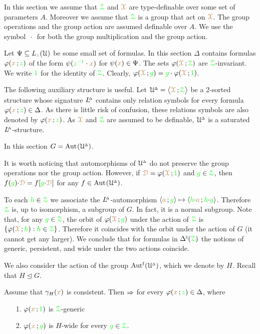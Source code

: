 In this section we assume that $\grZ$ and $\mrX$ are type-definable over some set of parameters $A$.
Moreover we assume that $\grZ$ is a group that act on $\mrX$.
The group operations and the group action are assumed definable over $A$.
We use the symbol $\,\cdot\,$ for both the group multiplication and the group action.

Let $\Psi\subseteq L_{\mr x}(\U)$ be some small set of formulas.
In this section $\Delta$ contains formulas $\phi({\mr x}\,;{\gr z})$ of the form  $\psi({\gr z^{-1}}\cdot{\mr x})$ for $\psi({\mr x})\in\Psi$.
The sets $\phi(\mrX\,;\grZ)$ are $\grZ$-invariant.
We write ${\gr 1}$ for the identity of $\grZ$.
Clearly, $\phi(\mrX\,;{\gr g})={\gr g}\cdot\phi(\mrX\,;{\gr 1})$.

The following auxiliary structure is useful.
Let $\UDelta=\big\<\mrX\,;\grZ\big\>$ be a 2-sorted structure whose signature $\LDelta$ contains only relation symbols for every formula $\phi({\mr x}\,;{\gr z})\in\Delta$.
As there is little risk of confusion, these relations symbols are also denoted by $\phi({\mr x}\,;{\gr z})$.
As $\mrX$ and $\grZ$ are assumed to be definable, $\UDelta$ is a saturated $\LDelta$-structure.

In this section $G=\Aut(\UDelta)$. 

It is worth noticing that automorphisms of $\UDelta$ do not preserve the group operations nor the group action.
However, if $\mrD=\phi(\mrX\,;{\gr 1})$ and ${\gr g}\in\grZ$, then $f({\gr g}){\cdot}\mrD=f[{\gr g}{\cdot}\mrD]$ for any $f\in\Aut(\UDelta)$.

To each ${\gr h}\in\grZ$ we associate the $\LDelta$-automorphism $\<{\mr a}\,;{\gr g}\>\mapsto\<{\gr h}{\cdot}{\mr a}\,;{\gr h}{\cdot}{\gr g}\>$.
Therefore $\grZ$ is, up to isomorphism, a subgroup of $G$.
In fact, it is a normal subgroup.
Note that, for any ${\gr g}\in\grZ$, the orbit of $\phi(\mrX\,;{\gr g})$ under the action of $\grZ$ is $\{\phi(\mrX\,;{\gr h}) : {\gr h}\in\grZ\}$.
Therefore it coincides with the orbit under the action of $G$ (it cannot get any larger).
We conclude that for formulas in $\pmDelta(\grZ)$ the notions of generic, persistent, and wide under the two actions coincide.

We also consider the action of the group $\Autf(\UDelta)$, which we denote by \emph{$H$.}
Recall that $H\trianglelefteq G$.

\begin{proposition}\label{prop_Ggeneric_persistent}
  Assume that $\gamma_H({\mr x})$ is consistent.
  Then $\IMP$ for every $\phi({\mr x}\,;{\gr z})\in\Delta$, where
  \begin{itemize}
    \item [1.] $\phi({\mr x}\,;{\gr 1})$ is $\grZ$-generic
    \item [2.] $\phi({\mr x}\,;{\gr g})$ is $H$-wide for every ${\gr g}\in\grZ$.
  \end{itemize}
\end{proposition}

